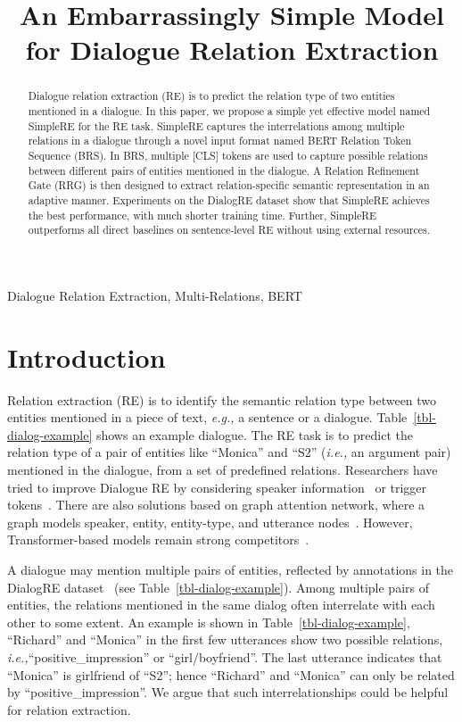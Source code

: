 \documentclass{article}
\title{An Embarrassingly Simple Model for Dialogue Relation Extraction}
\newcommand{\ie}{\emph{i.e.,}\xspace}
\newcommand{\eg}{\emph{e.g.,}\xspace}
\begin{document}
\maketitle

\begin{abstract}
Dialogue relation extraction (RE) is to predict the relation type of two entities mentioned in a dialogue. In this paper, we propose a simple yet effective model named SimpleRE for the RE task. SimpleRE captures the interrelations among multiple relations in a dialogue through a novel input format named BERT Relation Token Sequence (BRS). In BRS, multiple [CLS] tokens are used to capture possible relations between different pairs of entities mentioned in the dialogue. A Relation Refinement Gate (RRG) is then designed to extract relation-specific semantic representation in an adaptive manner. Experiments on the DialogRE dataset show that SimpleRE achieves the best performance, with much shorter training time. Further, SimpleRE outperforms all direct baselines on sentence-level RE without using external resources. 
\end{abstract}

\begin{keywords}
Dialogue Relation Extraction, Multi-Relations, BERT
\end{keywords}

\section{Introduction}\label{sec:intro}
Relation extraction (RE) is to identify the semantic relation type between two entities mentioned in a piece of text, \eg a sentence or a dialogue. Table~\ref{tbl-dialog-example} shows an example dialogue. The RE task is to predict the relation type of a pair of entities like ``Monica'' and ``S2'' (\ie an argument pair)  mentioned in the dialogue, from a set of predefined relations. Researchers have tried to improve Dialogue RE by considering speaker information~\cite{yu-etal-2020-dialogue} or trigger tokens~\cite{xue2020gdpnet}. There are also solutions based on graph attention network, where a graph models speaker, entity, entity-type, and utterance nodes~\cite{chen2020dialogue}. However, Transformer-based models remain strong competitors~\cite{yu-etal-2020-dialogue,xue2020gdpnet}.

A dialogue may mention multiple pairs of entities, reflected by  annotations in the DialogRE dataset~\cite{yu-etal-2020-dialogue} (see Table~\ref{tbl-dialog-example}). Among  multiple pairs of entities, the relations mentioned in the same dialog often interrelate with each other to some extent. An example is shown in Table~\ref{tbl-dialog-example}, ``Richard'' and ``Monica'' in the first few utterances show two possible relations, \ie ``positive\_impression'' or ``girl/boyfriend''. The last utterance indicates that ``Monica'' is girlfriend of ``S2''; hence ``Richard'' and ``Monica'' can only be related by ``positive\_impression''. We argue that such interrelationships could be helpful for relation extraction. 
\end{document}
